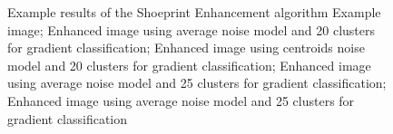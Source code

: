 \documentclass[draft,final]{vutinfth} %
\begin{document}
\begin{figure}[H]

\caption{Example results of the Shoeprint Enhancement algorithm
				 Example image;  Enhanced image using average noise model and 20 clusters for gradient classification;  Enhanced image using centroids noise model and 20 clusters for gradient classification;  Enhanced image using average noise model and 25 clusters for gradient classification;  Enhanced image using average noise model and 25 clusters for gradient classification}
\label{fig:sans:res1}

\end{figure}
\end{document}

